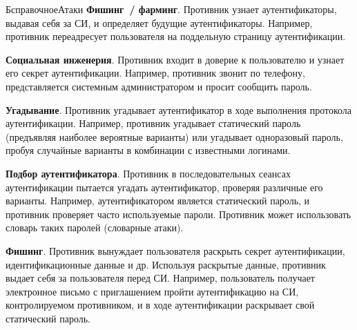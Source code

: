 \begin{appendix}{Б}{справочное}{Атаки}
{\bf Фишинг~/ фарминг}. 
Противник узнает аутентификаторы, выдавая себя за СИ, и определяет будущие 
аутентификаторы.
%
Например, противник переадресует пользователя на поддельную страницу 
аутентификации.


{\bf Социальная инженерия}. 
Противник входит в доверие к пользователю и узнает его секрет аутентификации.
%
Например, противник звонит по телефону, представляется системным администратором 
и просит сообщить пароль.


{\bf Угадывание}. 
Противник угадывает аутентификатор в ходе выполнения протокола аутентификации.
%
Например, противник угадывает статический пароль (предъявляя наиболее
вероятные варианты) или угадывает одноразовый пароль, пробуя случайные
варианты в комбинации с известными логинами.



\label{ATK.AP}

{\bf Подбор аутентификатора}. 
Противник в последовательных сеансах аутентификации пытается 
угадать аутентификатор, проверяя различные его варианты. 
Например, аутентификатором является статический пароль, 
и противник проверяет часто используемые пароли. 
Противник может использовать словарь таких паролей (словарные атаки).


{\bf Фишинг}. 
Противник вынуждает пользователя раскрыть секрет аутентификации, 
идентификационные данные и др. Используя раскрытые данные, противник 
выдает себя за пользователя перед СИ. Например, пользователь  
получает электронное письмо с приглашением пройти аутентификацию на 
СИ, контролируемом противником, и в ходе аутентификации раскрывает 
свой статический пароль. 


\end{appendix}
